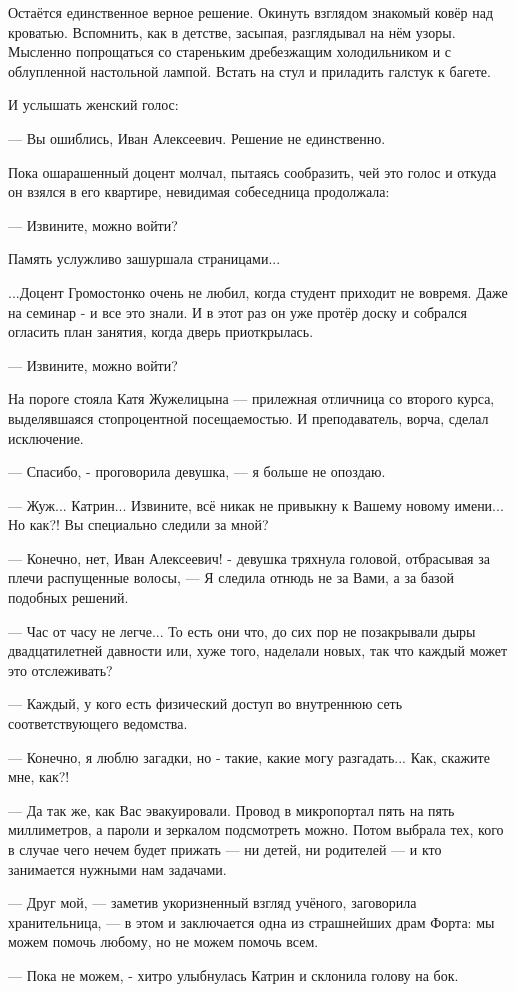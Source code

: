 Остаётся единственное верное решение. Окинуть взглядом знакомый ковёр над кроватью.
Вспомнить, как в детстве, засыпая, разглядывал на нём узоры.
Мысленно попрощаться со стареньким дребезжащим холодильником и с облупленной настольной лампой.
Встать на стул и приладить галстук к багете.

И услышать женский голос:

--- Вы ошиблись, Иван Алексеевич. Решение не единственно.

\emptypar

Пока ошарашенный доцент молчал, пытаясь сообразить, чей это голос и откуда он взялся в его квартире,
невидимая собеседница продолжала:

--- Извините, можно войти?

Память услужливо зашуршала страницами...

...Доцент Громостонко очень не любил, когда студент приходит не вовремя. Даже на семинар - и все это знали.
И в этот раз он уже протёр доску и собрался огласить план занятия, когда дверь приоткрылась.

--- Извините, можно войти?

На пороге стояла Катя Жужелицына --- прилежная отличница со второго курса, выделявшаяся стопроцентной посещаемостью.
И преподаватель, ворча, сделал исключение.

--- Спасибо, - проговорила девушка, --- я больше не опоздаю.

\emptypar

--- Жуж... Катрин... Извините, всё никак не привыкну к Вашему новому имени... Но как?! Вы специально следили за мной?

--- Конечно, нет, Иван Алексеевич! - девушка тряхнула головой, отбрасывая за плечи распущенные волосы,
--- Я следила отнюдь не за Вами, а за базой подобных решений.

--- Час от часу не легче... То есть они что, до сих пор не позакрывали дыры двадцатилетней давности или,
хуже того, наделали новых, так что каждый может это отслеживать?

--- Каждый, у кого есть физический доступ во внутреннюю сеть соответствующего ведомства.

--- Конечно, я люблю загадки, но - такие, какие могу разгадать... Как, скажите мне, как?!

--- Да так же, как Вас эвакуировали. Провод в микропортал пять на пять миллиметров, а пароли и зеркалом подсмотреть можно.
Потом выбрала тех, кого в случае чего нечем будет прижать --- ни детей, ни родителей --- и кто занимается нужными нам задачами.

--- Друг мой, --- заметив укоризненный взгляд учёного, заговорила хранительница, ---
в этом и заключается одна из страшнейших драм Форта: мы можем помочь любому, но не можем помочь всем.

--- Пока не можем, - хитро улыбнулась Катрин и склонила голову на бок.
